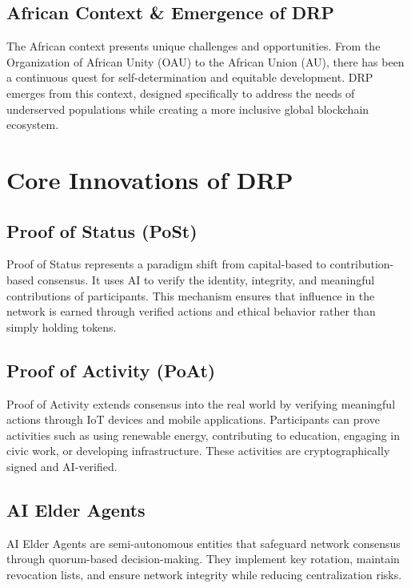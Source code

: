 \documentclass[11pt,a4paper]{article}
\begin{document}
\subsection{African Context \& Emergence of DRP}
The African context presents unique challenges and opportunities. From the Organization of African Unity (OAU) to the African Union (AU), there has been a continuous quest for self-determination and equitable development. DRP emerges from this context, designed specifically to address the needs of underserved populations while creating a more inclusive global blockchain ecosystem.


\section{Core Innovations of DRP}

\subsection{Proof of Status (PoSt)}
Proof of Status represents a paradigm shift from capital-based to contribution-based consensus. It uses AI to verify the identity, integrity, and meaningful contributions of participants. This mechanism ensures that influence in the network is earned through verified actions and ethical behavior rather than simply holding tokens.

\subsection{Proof of Activity (PoAt)}
Proof of Activity extends consensus into the real world by verifying meaningful actions through IoT devices and mobile applications. Participants can prove activities such as using renewable energy, contributing to education, engaging in civic work, or developing infrastructure. These activities are cryptographically signed and AI-verified.

\subsection{AI Elder Agents}
AI Elder Agents are semi-autonomous entities that safeguard network consensus through quorum-based decision-making. They implement key rotation, maintain revocation lists, and ensure network integrity while reducing centralization risks.
\end{document}
